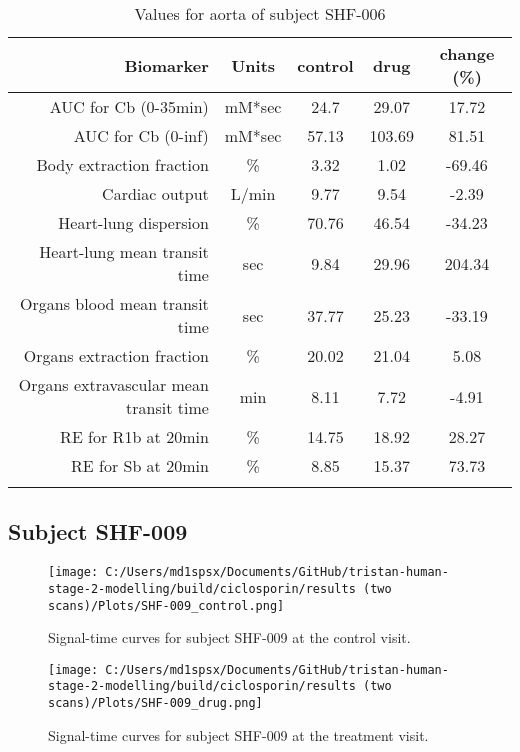 \documentclass{epflreport}%
\begin{document}
\begin{longtable}{rcccc}%
\hline%
Biomarker&Units&control&drug&change (\%)\\%
\hline%
AUC for Cb (0{-}35min)&mM*sec&24.7&29.07&17.72\\%
AUC for Cb (0{-}inf)&mM*sec&57.13&103.69&81.51\\%
Body extraction fraction&\%&3.32&1.02&{-}69.46\\%
Cardiac output&L/min&9.77&9.54&{-}2.39\\%
Heart{-}lung dispersion&\%&70.76&46.54&{-}34.23\\%
Heart{-}lung mean transit time&sec&9.84&29.96&204.34\\%
Organs blood mean transit time&sec&37.77&25.23&{-}33.19\\%
Organs extraction fraction&\%&20.02&21.04&5.08\\%
Organs extravascular mean transit time&min&8.11&7.72&{-}4.91\\%
RE for R1b at 20min&\%&14.75&18.92&28.27\\%
RE for Sb at 20min&\%&8.85&15.37&73.73\\%
\hline%
\caption{Values for aorta of subject SHF-006} \\%
\end{longtable}%
\clearpage%
\subsection{Subject SHF{-}009}%
\label{subsec:SubjectSHF{-}009}%

%


\begin{figure}[h!]%
\centering%
\texttt{[image: C:/Users/md1spsx/Documents/GitHub/tristan-human-stage-2-modelling/build/ciclosporin/results (two scans)/Plots/SHF-009\_control.png]}%
\caption{Signal{-}time curves for subject SHF{-}009 at the control visit.}%
\end{figure}

%


\begin{figure}[h!]%
\centering%
\texttt{[image: C:/Users/md1spsx/Documents/GitHub/tristan-human-stage-2-modelling/build/ciclosporin/results (two scans)/Plots/SHF-009\_drug.png]}%
\caption{Signal{-}time curves for subject SHF{-}009 at the treatment visit.}%
\end{figure}
\end{document}
